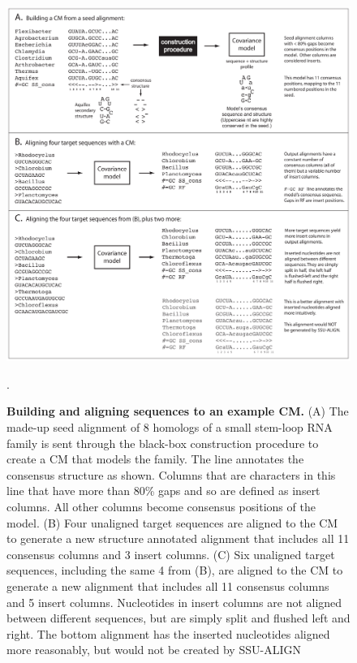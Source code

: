 \begin{figure}
\begin{center}
\includegraphics[width=6.5in]{Figures/sa-toy-example}
\end{center}
\caption{\textbf{Building and aligning sequences to an example CM.}
  (A) The made-up seed alignment of 8 homologs of a small stem-loop RNA
family is sent through the black-box construction procedure to create
a CM that models the family. The  line annotates
the consensus structure as shown. Columns that are  characters
in this line that have more than 80\% gaps and so are defined as insert
columns. All other columns become consensus positions of the
model. (B) Four unaligned target sequences
are aligned to the CM to generate a new structure annotated
alignment that includes all 11 consensus columns and 3 insert
columns. (C) Six unaligned target sequences, including the same 4 from
(B), are aligned to the CM to generate a new alignment that includes
all 11 consensus columns and 5 insert columns. Nucleotides in insert
columns are not aligned between different sequences, but are simply
split and flushed left and right. The bottom alignment has the
inserted nucleotides aligned more reasonably, but would not be created
by SSU-ALIGN}.
\label{fig:toyex}
\end{figure}

